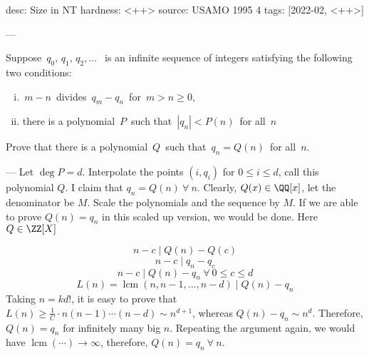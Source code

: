 desc: Size in NT
hardness: <++>
source: USAMO 1995 4
tags: [2022-02, <++>]

---

Suppose $\, q_0, \, q_1, \, q_2, \ldots \; \,$ is an infinite sequence of integers satisfying the following two conditions:
\begin{enumerate}[(i)]
\item $\, m-n \,$ divides $\, q_m-q_n\,$ for $\, m > n \geq 0,$
\item there is a polynomial $\, P \,$ such that $\, |q_n| < P(n) \,$ for all $\, n$
\end{enumerate}
Prove that there is a polynomial $\, Q \,$ such that $\, q_n= Q(n) \,$ for all $\, n$.

---
\newcommand{\lcm}{\operatorname{lcm}}
Let $\deg P = d$. Interpolate the points $(i, q_i)$ for $0\leq i \leq d$, call this polynomial 
  $Q$. I claim that $q_n = Q(n) \ \forall \ n$. Clearly, $Q(x) \in \QQ[x]$, let the denominator
  be $M$. Scale the polynomials and the sequence by $M$. If we are able to prove $Q(n) = q_n$
  in this scaled up version, we would be done. Here $Q \in \ZZ[X]$

  \[  
      n-c \mid Q(n) - Q(c) \]\[
      n-c \mid q_n - q_{c} \]\[
      n-c \mid Q(n) - q_n \ \forall \ 0 \leq c \leq d \]\[
      L(n)=\lcm(n,n-1,...,n-d) \mid Q(n) - q_n
  \]
  Taking $n = kd!$, it is easy to prove that $L(n) \geq \frac1{C} \cdot n(n-1)\cdots (n-d) \sim n^{d+1}$,
  whereas $Q(n) - q_n \sim n^d$. Therefore, $Q(n) = q_n$ for infinitely many
  big $n$. Repeating the argument again, we would have $\lcm(\cdots) \to \infty$, therefore,
  $Q(n) = q_n \ \forall \ n$.
